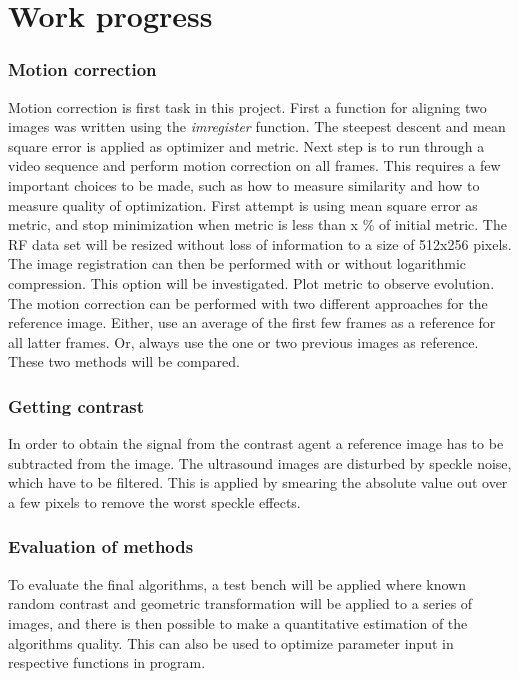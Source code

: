 \section{Work progress}
\subsubsection{Motion correction}
Motion correction is first task in this project. First a function for aligning two images was written using the \textit{imregister} function. The steepest descent and mean square error is applied as optimizer and metric. Next step is to run through a video sequence and perform motion correction on all frames. This requires a few important choices to be made, such as how to measure similarity and how to measure quality of optimization. First attempt is using mean square error as metric, and stop minimization when metric is less than x \% of initial metric. The RF data set will be resized without loss of information to a size of 512x256 pixels. The image registration can then be performed with or without logarithmic compression. This option will be investigated. Plot metric to observe evolution. The motion correction can be performed with two different approaches for the reference image. Either, use an average of the first few frames as a reference for all latter frames. Or, always use the one or two previous images as reference. These two methods will be compared. 


\subsubsection{Getting contrast}
In order to obtain the signal from the contrast agent a reference image has to be subtracted from the image. The ultrasound images are disturbed by speckle noise, which have to be filtered. This is applied by smearing the absolute value out over a few pixels to remove the worst speckle effects.

\subsubsection{Evaluation of methods}
To evaluate the final algorithms, a test bench will be applied where known random contrast and geometric transformation will be applied to a series of images, and there is then possible to make a quantitative estimation of the algorithms quality. This can also be used to optimize parameter input in respective functions in program. 